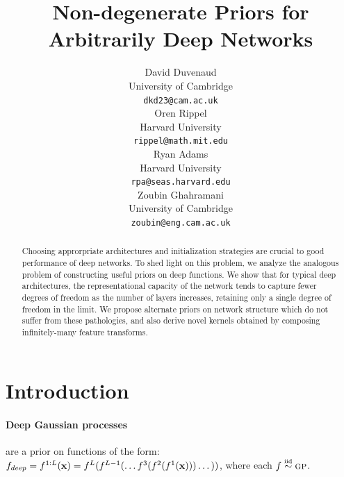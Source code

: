 \documentclass{article}
\title{Non-degenerate Priors for Arbitrarily Deep Networks}
\author{
David Duvenaud \\
University of Cambridge \\
\texttt{dkd23@cam.ac.uk} \\
\And
Oren Rippel \\
Harvard University \\
\texttt{rippel@math.mit.edu} \\
\AND
Ryan Adams \\
Harvard University \\
\texttt{rpa@seas.harvard.edu} \\
\And
Zoubin Ghahramani \\
University of Cambridge \\
\texttt{zoubin@eng.cam.ac.uk} \\
}
\begin{document}
\maketitle

\begin{abstract}
Choosing approrpriate architectures and initialization strategies are crucial to good performance of deep networks.  To shed light on this problem, we analyze the analogous problem of constructing useful priors on deep functions.
We show that for typical deep architectures, the representational capacity of the network tends to capture fewer degrees of freedom as the number of layers increases, retaining only a single degree of freedom in the limit.  
We propose alternate priors on network structure which do not suffer from these pathologies, %
and also derive novel kernels obtained by composing infinitely-many feature transforms.
\end{abstract}

\section{Introduction}

\paragraph{Deep Gaussian processes}
 are a prior on functions of the form: $f_{deep} = f^{1:L}({\bf{x}}) = f^L(f^{L-1}(\dots f^3(f^2(f^1({\bf{x}})))\dots))$, where each $f \simiid \gp{}$.  

\end{document}
